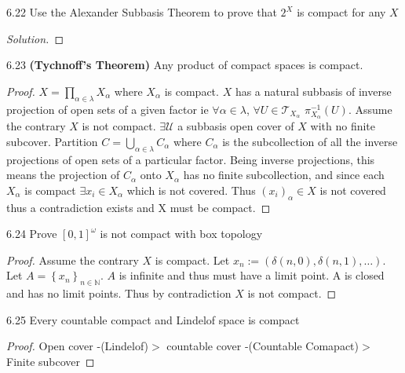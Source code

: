 \documentclass{article}
\newcommand*{\T}{\mathcal{T}}
\newcommand{\N}{\mathbb{N}}
\newenvironment{solution}
{\renewcommand\qedsymbol{$\blacksquare$}\begin{proof}[Solution]}
{\end{proof}}
\begin{document}
\bigskip

\begin{PROB}{6.22}\label{Problem 6.22.}
    Use the Alexander Subbasis Theorem to prove that $2^X$ is compact for any $X$  
\end{PROB}
\begin{solution}
\end{solution}

\bigskip

\begin{claim}{6.23}\label{Claim 6.23.}
    \textbf{(Tychnoff's Theorem)} Any product of compact spaces is compact.
\end{claim}
\begin{proof}
    $X = \prod_{\alpha \in \lambda} X_\alpha$ where $X_\alpha$ is compact. $X$ has a natural subbasis of inverse projection of open sets of a given factor ie $\forall \alpha \in \lambda$, $\forall U \in \T_{X_{\alpha}}$ $\pi_{X_\alpha}^{-1}(U)$. Assume the contrary $X$ is not compact. $\exists \mathcal{U}$ a subbasis open cover of $X$ with no finite subcover. Partition $C = \bigcup_{\alpha \in \lambda} C_\alpha$ where $C_\alpha$ is the subcollection of all the inverse projections of open sets of a particular factor. Being inverse projections, this means the projection of $C_\alpha$ onto $X_\alpha$ has no finite subcollection, and since each $X_\alpha$ is compact $\exists x_{i} \in X_\alpha$ which is not covered. Thus $(x_i)_\alpha \in X$ is not covered thus a contradiction exists and X must be compact.               
\end{proof}

\bigskip

\begin{PROB}{6.24}\label{Problem 6.24.}
    Prove $[0, 1]^\omega$ is not compact with box topology 
\end{PROB}
\begin{proof}
    Assume the contrary $X$ is compact.  
    Let $x_n := (\delta(n, 0), \delta(n, 1), \dots)$. Let $A = \left\{ x_n \right\}_{n \in \N}$. $A$ is infinite and thus must have a limit point. A is closed and has no limit points. Thus by contradiction $X$ is not compact.  
\end{proof}

\pagebreak 

\begin{claim}{6.25}\label{Claim 6.25.}
    Every countable compact and Lindelof space is compact
\end{claim}
\begin{proof}
    Open cover -(Lindelof)$>$ countable cover -(Countable Comapact)$>$ Finite subcover 
\end{proof}
\end{document}
